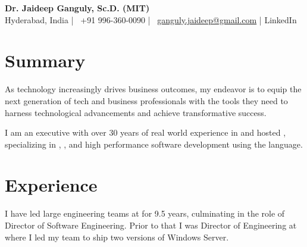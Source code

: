 \documentclass[article, a4paper, 11pt, twoside, openright, english]{memoir}
\begin{document}
\pagestyle{empty}

\begin{tcolorbox}[colback=gray!20, colframe=white, boxrule=0pt, sharp corners, width=\textwidth, halign=center]
    \textbf{\Large Dr. Jaideep Ganguly, Sc.D. (MIT)} \\
    \vspace{1mm}
   Hyderabad, India |
   \textcolor{maroon}{\faPhone} \ +91 996-360-0090 | \textcolor{maroon}{\faEnvelope} \ \href{mailto:ganguly.jaideep@gmail.com}{ganguly.jaideep@gmail.com} | 
   LinkedIn
   \href{https://www.linkedin.com/in/}{\faLinkedin}
\end{tcolorbox}

\vspace{-8mm} 
\section*{Summary}
As technology increasingly drives business outcomes, my endeavor is to equip the next generation of tech and business professionals with the tools they need to harness technological advancements and achieve transformative success.

I am an  executive with over 30 years of real world experience in  and  hosted , specializing in , , and high performance software development using the  language. 

\vspace{-5mm} 
\section*{Experience}
I have led large engineering teams at  for 9.5 years, culminating in the role of Director of Software Engineering. Prior to that I was Director of Engineering at  where I led my team to ship two versions of Windows Server.


\end{document}
